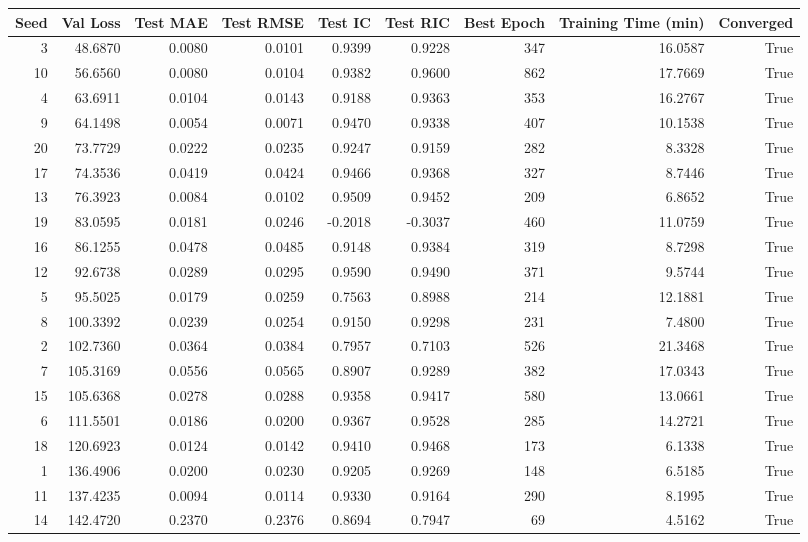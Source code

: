 \begin{tabular}{rrrrrrrrr}
\toprule
Seed & Val Loss & Test MAE & Test RMSE & Test IC & Test RIC & Best Epoch & Training Time (min) & Converged \\
\midrule
3 & 48.6870 & 0.0080 & 0.0101 & 0.9399 & 0.9228 & 347 & 16.0587 & True \\
10 & 56.6560 & 0.0080 & 0.0104 & 0.9382 & 0.9600 & 862 & 17.7669 & True \\
4 & 63.6911 & 0.0104 & 0.0143 & 0.9188 & 0.9363 & 353 & 16.2767 & True \\
9 & 64.1498 & 0.0054 & 0.0071 & 0.9470 & 0.9338 & 407 & 10.1538 & True \\
20 & 73.7729 & 0.0222 & 0.0235 & 0.9247 & 0.9159 & 282 & 8.3328 & True \\
17 & 74.3536 & 0.0419 & 0.0424 & 0.9466 & 0.9368 & 327 & 8.7446 & True \\
13 & 76.3923 & 0.0084 & 0.0102 & 0.9509 & 0.9452 & 209 & 6.8652 & True \\
19 & 83.0595 & 0.0181 & 0.0246 & -0.2018 & -0.3037 & 460 & 11.0759 & True \\
16 & 86.1255 & 0.0478 & 0.0485 & 0.9148 & 0.9384 & 319 & 8.7298 & True \\
12 & 92.6738 & 0.0289 & 0.0295 & 0.9590 & 0.9490 & 371 & 9.5744 & True \\
5 & 95.5025 & 0.0179 & 0.0259 & 0.7563 & 0.8988 & 214 & 12.1881 & True \\
8 & 100.3392 & 0.0239 & 0.0254 & 0.9150 & 0.9298 & 231 & 7.4800 & True \\
2 & 102.7360 & 0.0364 & 0.0384 & 0.7957 & 0.7103 & 526 & 21.3468 & True \\
7 & 105.3169 & 0.0556 & 0.0565 & 0.8907 & 0.9289 & 382 & 17.0343 & True \\
15 & 105.6368 & 0.0278 & 0.0288 & 0.9358 & 0.9417 & 580 & 13.0661 & True \\
6 & 111.5501 & 0.0186 & 0.0200 & 0.9367 & 0.9528 & 285 & 14.2721 & True \\
18 & 120.6923 & 0.0124 & 0.0142 & 0.9410 & 0.9468 & 173 & 6.1338 & True \\
1 & 136.4906 & 0.0200 & 0.0230 & 0.9205 & 0.9269 & 148 & 6.5185 & True \\
11 & 137.4235 & 0.0094 & 0.0114 & 0.9330 & 0.9164 & 290 & 8.1995 & True \\
14 & 142.4720 & 0.2370 & 0.2376 & 0.8694 & 0.7947 & 69 & 4.5162 & True \\
\bottomrule
\end{tabular}
